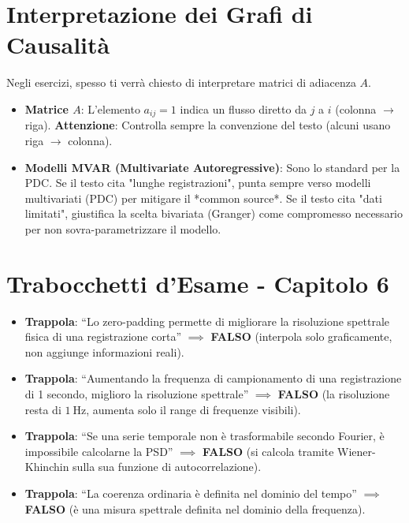 \documentclass[10pt, letterpaper]{report}
\begin{document}
\section{Interpretazione dei Grafi di Causalità}
Negli esercizi, spesso ti verrà chiesto di interpretare matrici di adiacenza $A$.
\begin{itemize}
    \item \textbf{Matrice $A$}: L'elemento $a_{ij} = 1$ indica un flusso diretto da $j$ a $i$ (colonna $\to$ riga). \textbf{Attenzione}: Controlla sempre la convenzione del testo (alcuni usano riga $\to$ colonna).
    \item \textbf{Modelli MVAR (Multivariate Autoregressive)}: Sono lo standard per la PDC. Se il testo cita "lunghe registrazioni", punta sempre verso modelli multivariati (PDC) per mitigare il *common source*. Se il testo cita "dati limitati", giustifica la scelta bivariata (Granger) come compromesso necessario per non sovra-parametrizzare il modello.
\end{itemize}



\section*{Trabocchetti d'Esame - Capitolo 6}
\begin{itemize}
    \item \textbf{Trappola}: ``Lo zero-padding permette di migliorare la risoluzione spettrale fisica di una registrazione corta'' \(\implies\) \textbf{FALSO} (interpola solo graficamente, non aggiunge informazioni reali).
    \item \textbf{Trappola}: ``Aumentando la frequenza di campionamento di una registrazione di 1 secondo, miglioro la risoluzione spettrale'' \(\implies\) \textbf{FALSO} (la risoluzione resta di \(1\ \text{Hz}\), aumenta solo il range di frequenze visibili).
    \item \textbf{Trappola}: ``Se una serie temporale non è trasformabile secondo Fourier, è impossibile calcolarne la PSD'' \(\implies\) \textbf{FALSO} (si calcola tramite Wiener-Khinchin sulla sua funzione di autocorrelazione).
    \item \textbf{Trappola}: ``La coerenza ordinaria è definita nel dominio del tempo'' \(\implies\) \textbf{FALSO} (è una misura spettrale definita nel dominio della frequenza).
\end{itemize}
\end{document}
